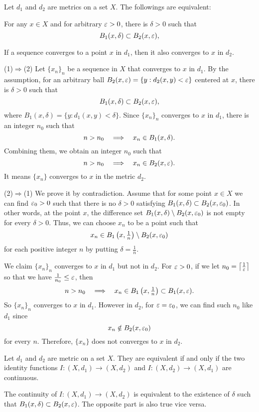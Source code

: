 \begin{lem}
Let $d_1$ and $d_2$ are metrics on a set $X$.
The followings are equivalent:
\begin{cond}
\item For any $x\in X$ and for arbitrary $\varepsilon>0$, there is $\delta>0$ such that
\[B_1(x,\delta)\subset B_2(x,\varepsilon),\]
\item If a sequence converges to a point $x$ in $d_1$, then it also converges to $x$ in $d_2$.
\end{cond}
\end{lem}
\begin{pf}
(1)$\Rightarrow$(2)
Let $\{x_n\}_n$ be a sequence in $X$ that converges to $x$ in $d_1$.
By the assumption, for an arbitrary ball $B_2(x,\varepsilon)=\{y:d_2(x,y)<\varepsilon\}$ centered at $x$, there is $\delta>0$ such that
\[B_1(x,\delta)\subset B_2(x,\varepsilon),\]
where $B_1(x,\delta)=\{y:d_1(x,y)<\delta\}$.
Since $\{x_n\}_n$ converges to $x$ in $d_1$, there is an integer $n_0$ such that
\[n>n_0\impl x_n\in B_1(x,\delta).\]
Combining them, we obtain an integer $n_0$ such that
\[n>n_0\impl x_n\in B_2(x,\e).\]
It means $\{x_n\}$ converges to $x$ in the metric $d_2$.

(2)$\Rightarrow$(1)
We prove it by contradiction.
Assume that for some point $x\in X$ we can find $\varepsilon_0>0$ such that there is no $\delta>0$ satisfying $B_1(x,\delta)\subset B_2(x,\varepsilon_0)$.
In other words, at the point $x$, the difference set $B_1(x,\delta)\setminus B_2(x,\varepsilon_0)$ is not empty for every $\delta>0$.
Thus, we can choose $x_n$ to be a point such that
\[x_n\in B_1\left(x,\tfrac1n\right)\setminus B_2(x,\varepsilon_0)\]
for each positive integer $n$ by putting $\delta=\frac1n$.

We claim $\{x_n\}_n$ converges to $x$ in $d_1$ but not in $d_2$.
For $\varepsilon>0$, if we let $n_0=\left\lceil\frac1{\varepsilon}\right\rceil$ so that we have $\frac1{n_0}\le\varepsilon$, then
\[n>n_0\impl x_n\in B_1\left(x,\tfrac1n\right)\subset B_1(x,\e).\]
So $\{x_n\}_n$ converges to $x$ in $d_1$.
However in $d_2$, for $\varepsilon=\varepsilon_0$, we can find such $n_0$ like $d_1$ since
\[x_n\notin B_2(x,\varepsilon_0)\]
for every $n$.
Therefore, $\{x_n\}$ does not converges to $x$ in $d_2$.
\end{pf}
\begin{prop}
Let $d_1$ and $d_2$ are metric on a set $X$.
They are equivalent if and only if the two identity functions $I:(X,d_1)\to(X,d_2)$ and $I:(X,d_2)\to(X,d_1)$ are continuous.
\end{prop}
\begin{pf}
The continuity of $I:(X,d_1)\to(X,d_2)$ is equivalent to the existence of $\delta$ such that $B_1(x,\delta)\subset B_2(x,\varepsilon)$.
The opposite part is also true vice versa.
\end{pf}

